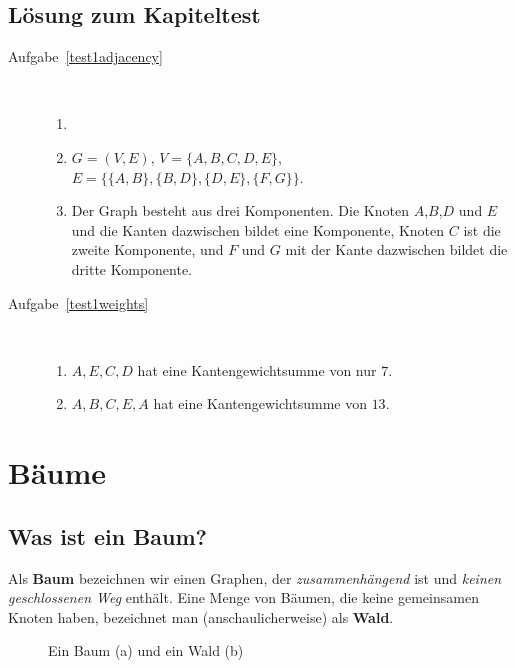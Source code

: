 \documentclass[12pt,a4paper]{report}
\theoremstyle{break}
\theoremstyle{plain}
\begin{document}
\section{L\"{o}sung zum Kapiteltest}
\begin{description}
\item[Aufgabe~\ref{test1adjacency}] \hfill \\[0cm]
\begin{enumerate}
\item 
\begin{figure}[H]
\centerline{
}
\end{figure}

\item $G = (V,E)$, $V = \{A, B, C, D, E\}$, $E=\{ \{A, B\}, \{B, D\},\{D, E\},\{F, G\}\}$.
\item Der Graph besteht aus drei Komponenten. Die Knoten $A$,$B$,$D$ und $E$ und die Kanten dazwischen bildet 
eine Komponente, Knoten $C$ ist die zweite Komponente, und $F$ und $G$ mit der Kante dazwischen bildet die dritte Komponente.
\end{enumerate}

\item[Aufgabe~\ref{test1weights}] \hfill \\[0cm]
\begin{enumerate}
\item $A, E, C, D$ hat eine Kantengewichtsumme von nur $7$.
\item $A, B, C, E, A$ hat eine Kantengewichtsumme von $13$.
\end{enumerate}
\end{description}

\chapter{B\"{a}ume}

\section{Was ist ein Baum?}

Als \textbf{Baum} bezeichnen wir einen Graphen, der
\emph{zusammenh\"{a}ngend} ist und \emph{keinen geschlossenen Weg}
enth\"{a}lt. Eine Menge von B\"{a}umen, die keine gemeinsamen Knoten
haben, bezeichnet man (anschaulicherweise) als \textbf{Wald}.

\begin{figure}[h!]
\begin{subfigure}[b]{0.35\textwidth}
\caption{}
\end{subfigure}
\begin{subfigure}[b]{0.6\textwidth}
\caption{}
\end{subfigure}
\caption{Ein Baum (a) und ein Wald (b)}
\end{figure}
\end{document}
